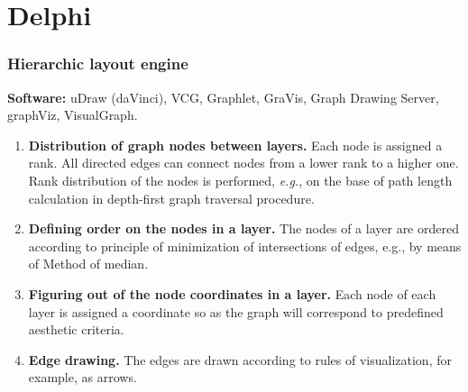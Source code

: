 \documentclass{beamer}
\begin{document}

\section{Delphi}
\begin{frame}
\frametitle{Hierarchic layout engine}
\textbf{Software:} uDraw (daVinci), VCG, Graphlet, GraVis, Graph Drawing Server, graphViz, VisualGraph.
\begin{enumerate}
\item \textbf{Distribution of graph nodes between layers.} Each node is assigned a rank.  All directed edges can connect nodes from a lower rank to a higher one.  Rank distribution of the nodes is performed, \emph{e.g.}, on the base of path length calculation in depth-first graph traversal procedure.
\item \textbf{Defining order on the nodes in a layer.} The nodes of a layer are ordered according to principle of minimization of intersections of edges, e.g., by means of Method of median.
\item \textbf{Figuring out of the node coordinates in a layer.} Each node of each layer is assigned a coordinate so as the graph will correspond to predefined aesthetic criteria.
\item \textbf{Edge drawing.} The edges are drawn according to rules of visualization, for example, as arrows.
\end{enumerate}
\end{frame}

\end{document}
